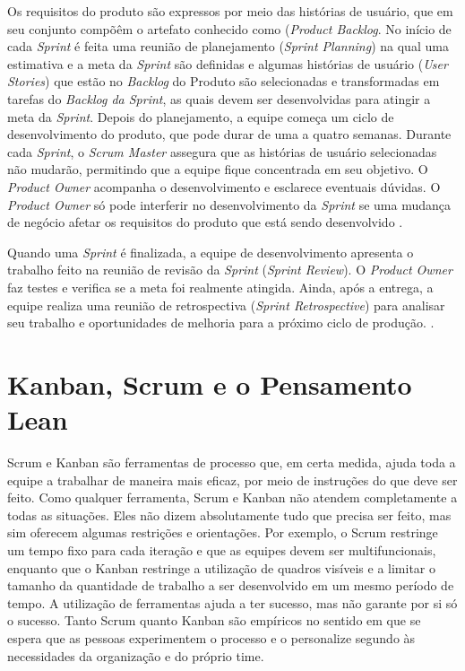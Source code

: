 Os requisitos do produto são expressos por meio das histórias de usuário, que em seu conjunto compõêm o artefato conhecido como (\textit{Product Backlog}. No início de cada \textit{Sprint} é feita uma reunião de planejamento (\textit{Sprint Planning}) na qual uma estimativa e a meta da \textit{Sprint} são definidas e algumas histórias de usuário (\textit{User Stories}) que estão no \textit{Backlog} do Produto são selecionadas e transformadas em tarefas do \textit{Backlog da Sprint}, as quais devem ser desenvolvidas para atingir a meta da \textit{Sprint}. Depois do planejamento, a equipe começa um ciclo de desenvolvimento do produto, que pode durar de uma a quatro semanas. Durante cada \textit{Sprint}, o \textit{Scrum Master} assegura que as histórias de usuário selecionadas não mudarão, permitindo que a equipe fique concentrada em seu objetivo. O \textit{Product Owner} acompanha o desenvolvimento e esclarece eventuais dúvidas. O \textit{Product Owner} só pode interferir no desenvolvimento da \textit{Sprint} se uma mudança de negócio afetar os requisitos do produto que está sendo desenvolvido  \cite{jeff}.

Quando uma \textit{Sprint} é finalizada, a equipe de desenvolvimento apresenta o trabalho feito na reunião de revisão da \textit{Sprint} (\textit{Sprint Review}). O \textit{Product Owner} faz testes e verifica se a meta foi realmente atingida. Ainda, após a entrega, a equipe realiza uma reunião de retrospectiva (\textit{Sprint Retrospective}) para analisar seu trabalho e oportunidades de melhoria para a próximo ciclo de produção.   \cite{jeff}. 

\section[Kanban, Scrum e o Pensamento Lean ]{Kanban, Scrum e o Pensamento Lean }

Scrum e Kanban são ferramentas de processo que, em certa medida, ajuda toda a equipe a trabalhar de maneira mais eficaz, por meio de instruções do que deve ser feito. Como qualquer ferramenta, Scrum e Kanban não atendem completamente a todas as situações. Eles não dizem absolutamente tudo que precisa ser feito, mas sim oferecem algumas restrições e orientações. Por exemplo, o Scrum restringe um tempo fixo para cada iteração e que as equipes devem ser multifuncionais, enquanto que o Kanban restringe a utilização de quadros visíveis e a limitar o tamanho da quantidade de trabalho a ser desenvolvido em um mesmo período de tempo. A utilização de ferramentas ajuda a ter sucesso, mas não garante por si só o sucesso. Tanto Scrum quanto Kanban são empíricos no sentido em que se espera que as pessoas experimentem o processo e o personalize segundo às necessidades da organização e do próprio time.

